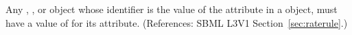 Any \Compartment, \Species, \Parameter or \SpeciesReference object whose
identifier is the value of the attribute  in a \RateRule
object, must have a value of  for its 
attribute.  (References: SBML L3V1 Section~\ref{sec:raterule}.)
